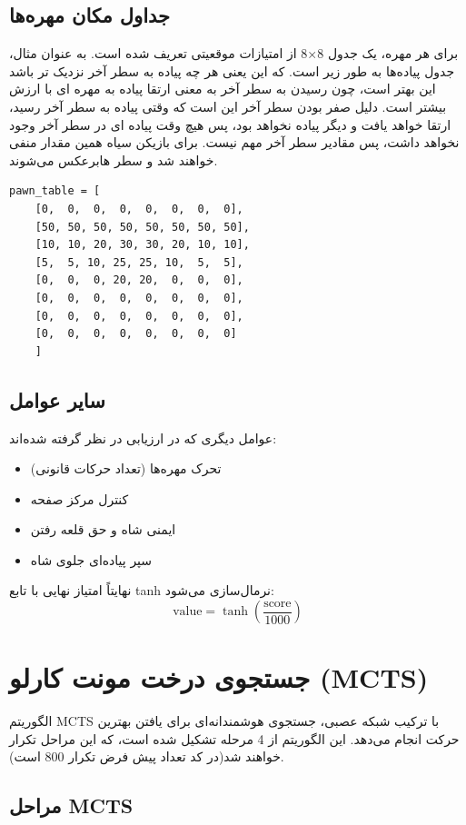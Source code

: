 \documentclass[12pt,a4paper]{article}
\begin{document}
	\subsection{جداول مکان مهره‌ها}
	برای هر مهره، یک جدول 8×8 از امتیازات موقعیتی تعریف شده است. به عنوان مثال، جدول پیاده‌ها به طور زیر است. که این یعنی هر چه پیاده به سطر آخر نزدیک تر باشد این بهتر است، چون رسیدن به سطر آخر به معنی ارتقا پیاده به مهره ای با ارزش بیشتر است. دلیل صفر بودن سطر آخر این است که وقتی پیاده به سطر آخر رسید، ارتقا خواهد یافت و دیگر پیاده نخواهد بود، پس هیچ وقت پیاده ای در سطر آخر وجود نخواهد داشت، پس مقادیر سطر آخر مهم نیست. برای بازیکن سیاه همین مقدار منفی خواهند شد و سطر هابرعکس می‌شوند.
	\\
	\begin{latin}
\begin{verbatim}
pawn_table = [
    [0,  0,  0,  0,  0,  0,  0,  0],
    [50, 50, 50, 50, 50, 50, 50, 50],
    [10, 10, 20, 30, 30, 20, 10, 10],
    [5,  5, 10, 25, 25, 10,  5,  5],
    [0,  0,  0, 20, 20,  0,  0,  0],
    [0,  0,  0,  0,  0,  0,  0,  0],
    [0,  0,  0,  0,  0,  0,  0,  0],
    [0,  0,  0,  0,  0,  0,  0,  0] 
    ]
\end{verbatim}
	\end{latin}
	\subsection{سایر عوامل}
	عوامل دیگری که در ارزیابی در نظر گرفته شده‌اند:
	\begin{itemize}		
		\item تحرک مهره‌ها (تعداد حرکات قانونی)
		\item کنترل مرکز صفحه
		\item ایمنی شاه و حق قلعه رفتن
		\item سپر پیاده‌ای جلوی شاه
	\end{itemize}
	
	نهایتاً امتیاز نهایی با تابع tanh نرمال‌سازی می‌شود:
	\[
	\text{value} = \tanh(\frac{\text{score}}{1000})
	\]
	
	\section{جستجوی درخت مونت کارلو (MCTS)}
	الگوریتم MCTS با ترکیب شبکه عصبی، جستجوی هوشمندانه‌ای برای یافتن بهترین حرکت انجام می‌دهد. این الگوریتم از 4 مرحله تشکیل شده است، که این مراحل تکرار خواهند شد(در کد تعداد پیش فرض تکرار 800 است).
	
	\subsection{مراحل MCTS}
	
\end{document}
